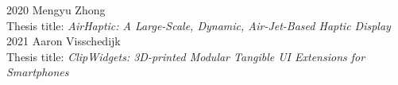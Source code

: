 
      \begin{cvreviews}
        \cvreview
          {2020}
          {Mengyu Zhong\\
          Thesis title: \emph{AirHaptic: A Large-Scale, Dynamic, Air-Jet-Based Haptic Display}}
        \cvreview
          {2021}
          {Aaron Visschedijk\\
          Thesis title: \emph{ClipWidgets: 3D-printed Modular Tangible UI Extensions for Smartphones}}
      \end{cvreviews}